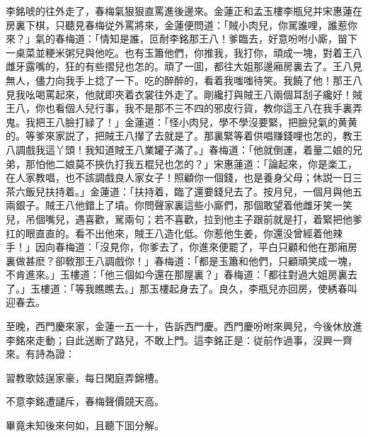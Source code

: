 李銘唬的往外走了，春梅氣狠狠直罵進後邊來。金蓮正和孟玉樓李瓶兒并宋惠蓮在房裏下棋，只聽見春梅従外罵將來，金蓮便問道：「賊小肉兒，你駡誰哩，誰惹你來？」氣的春梅道：「情知是誰，叵耐李銘那王八！爹臨去，好意吩咐小廝，㽞下一桌菜並粳米粥兒與他吃。也有玉簫他們，你推我，我打你，頑成一塊，對着王八雌牙露嘴的，狂的有些摺兒也怎的。頑了一囬，都往大姐那邊廂房裏去了。王八見無人，儘力向我手上捻了一下。吃的醉醉的，看着我嗤嗤待笑。我饒了他！那王八見我吆喝罵起來，他就即夾着衣裳往外走了。剛纔打與賊王八兩個耳刮子纔好！賊王八，你也看個人兒行事，我不是那不三不四的邪皮行貨，教你這王八在我手裏弄鬼。我把王八臉打緑了！」金蓮道：「怪小肉兒，學不學沒要緊，把臉兒氣的黄黄的。等爹來家説了，把賊王八攆了去就是了。那裏緊等着供唱赚錢哩也怎的，教王八調戲我這丫頭！我知道賊王八業罐子滿了。」春梅道：「他就倒運，着量二娘的兄弟，那怕他二娘莫不挾仇打我五棍兒也怎的？」宋惠蓮道：「論起來，你是楽工，在人家教唱，也不該調戲良人家女子！照顧你一個錢，也是養身父母；休説一日三茶六飯兒扶持着。」金蓮道：「扶持着，臨了還要錢兒去了。按月兒，一個月與他五兩銀子。賊王八他錯上了墳。你問聲家裏這些小廝們，那個敢望着他雌牙笑一笑兒，吊個嘴兒，遇喜歡，駡兩句；若不喜歡，拉到他主子跟前就是打，着緊把他爹扛的眼直直的。看不出他來，賊王八造化低。你惹他生姜，你還没曾經着他辣手！」因向春梅道：「沒見你，你爹去了，你進來便罷了，平白只顧和他在那廂房裏做甚麽？卻敎那王八調戲你！」春梅道：「都是玉簫和他們，只顧頑笑成一塊，不肯進來。」玉樓道：「他三個如今還在那屋裏？」春梅道：「都往對過大姐房裏去了。」玉樓道：「等我瞧瞧去。」那玉樓起身去了。良久，李瓶兒亦回房，使綉春叫迎春去。

至晚，西門慶來家，金蓮一五一十，告訴西門慶。西門慶吩咐來興兒，今後休放進李銘來走動；自此送断了路兒，不敢上門。這李銘正是：従前作過事，沒興一齊來。有詩為證：

\begin{myquote}
習教歌妓逞家豪，每日閑庭弄錦槽。

不意李銘遭譴斥，春梅聲價競天高。
\end{myquote}

畢竟未知後來何如，且聽下囬分解。

